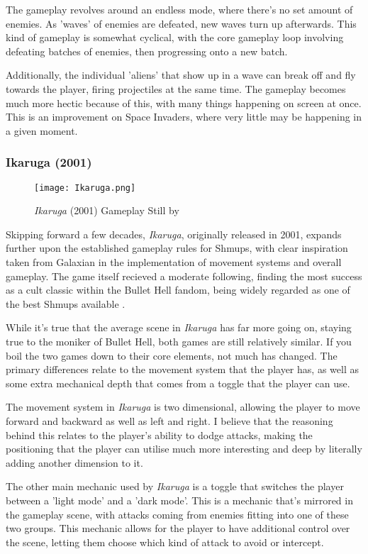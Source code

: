 \documentclass{scrartcl}
\let\cite\textcite
\let\citep\autocite
\begin{document}
The gameplay revolves around an endless mode, where there's no set amount of enemies. As 'waves' of enemies are defeated, new waves turn up afterwards. This kind of gameplay is somewhat cyclical, with the core gameplay loop involving defeating batches of enemies, then progressing onto a new batch.

Additionally, the individual 'aliens' that show up in a wave can break off and fly towards the player, firing projectiles at the same time. The gameplay becomes much more hectic because of this, with many things happening on screen at once. This is an improvement on Space Invaders, where very little may be happening in a given moment.

\subsubsection{Ikaruga (2001)}

\begin{figure}[ht]
  \centering
  \texttt{[image: Ikaruga.png]}
  \caption[\textit{Ikaruga}]{\textit{Ikaruga} (2001) Gameplay Still by \cite{Youtube003}}
\end{figure}

Skipping forward a few decades, \textit{Ikaruga}, originally released in 2001, expands further upon the established gameplay rules for Shmups, with clear inspiration taken from Galaxian in the implementation of movement systems and overall gameplay. The game itself recieved a moderate following, finding the most success as a cult classic within the Bullet Hell fandom, being widely regarded as one of the best Shmups available \citep{GiantBomb002}.

While it's true that the average scene in \textit{Ikaruga} has far more going on, staying true to the moniker of Bullet Hell, both games are still relatively similar. If you boil the two games down to their core elements, not much has changed. The primary differences relate to the movement system that the player has, as well as some extra mechanical depth that comes from a toggle that the player can use.

The movement system in \textit{Ikaruga} is two dimensional, allowing the player to move forward and backward as well as left and right. I believe that the reasoning behind this relates to the player's ability to dodge attacks, making the positioning that the player can utilise much more interesting and deep by literally adding another dimension to it.

The other main mechanic used by \textit{Ikaruga} is a toggle that switches the player between a 'light mode' and a 'dark mode'. This is a mechanic that's mirrored in the gameplay scene, with attacks coming from enemies fitting into one of these two groups. This mechanic allows for the player to have additional control over the scene, letting them choose which kind of attack to avoid or intercept.
\end{document}
